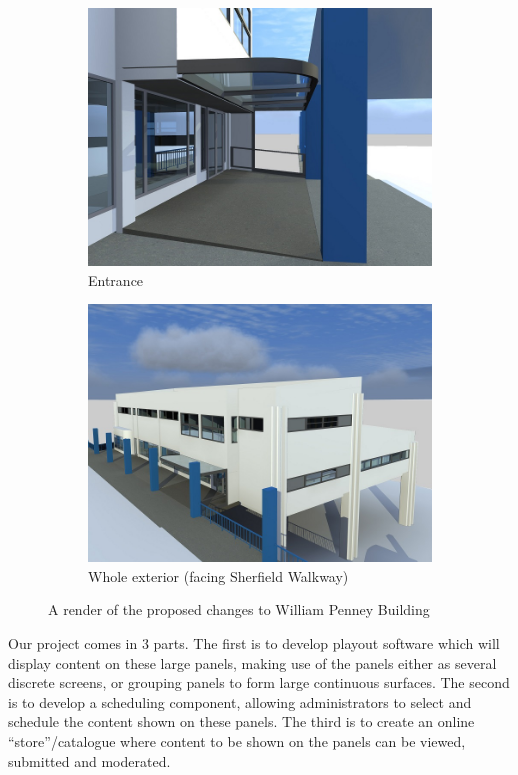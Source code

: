 \documentclass[a4paper, titlepage]{article}
\begin{document}
\begin{figure}[h!]
\begin{subfigure}{.5\textwidth}
  \centering
  \includegraphics[width=.9\linewidth]{./intro/Entrance.jpg}
  \caption{Entrance}
  \label{fig:sub1}
\end{subfigure}
\begin{subfigure}{.5\textwidth}
  \centering
  \includegraphics[width=.9\linewidth]{./intro/External.jpg}
  \caption{Whole exterior (facing Sherfield Walkway)}
  \label{fig:sub2}
\end{subfigure}
\caption{A render of the proposed changes to William Penney Building}
\label{fig:intro_WPrender}
\end{figure}

Our project comes in 3 parts. The first is to develop playout software which will display content on these large panels, making use of the panels either as several discrete screens, or grouping panels to form large continuous surfaces. The second is to develop a scheduling component, allowing administrators to select and schedule the content shown on these panels. The third is to create an online ``store''/catalogue where content to be shown on the panels can be viewed, submitted and moderated.
\end{document}
